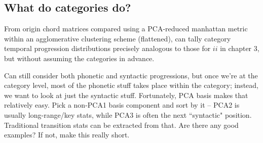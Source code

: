\subsection{What do categories do?}
From origin chord matrices compared using a PCA-reduced manhattan metric within an agglomerative clustering scheme (flattened), can tally category temporal progression distributions precisely analogous to those for $ii$ in chapter 3, but without assuming the categories in advance.

Can still consider both phonetic and syntactic progressions, but once we're at the category level, most of the phonetic stuff takes place within the category; instead, we want to look at just the syntactic stuff.  Fortunately, PCA basis makes that relatively easy.  Pick a non-PCA1 basis component and sort by it -- PCA2 is usually long-range/key stats, while PCA3 is often the next ``syntactic" position.  Traditional transition stats can be extracted from that.  Are there any good examples?  If not, make this really short.

